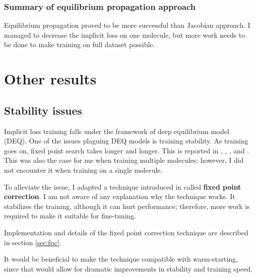 \documentclass[a4paper,10.5pt]{report}
\begin{document}
\subsubsection{Summary of equilibrium propagation approach}
Equilibrium propagation proved to be more successful than Jacobian approach. I managed to decrease the implicit loss on one molecule, but more work needs to be done to make training on full dataset possible.
\section{Other results}

\subsection{Stability issues}
Implicit loss training falls under the framework of deep equilibrium model (DEQ). One of the issues plaguing DEQ models is training stability. As training goes on, fixed point search takes longer and longer. This is reported in \cite{opticalflow}, \cite{bai2021stabilizing}, \cite{burger2025dequify}, and \cite{geng2023torchdeq}. This was also the case for me when training multiple molecules; however, I did not encounter it when training on a single molecule.

To alleviate the issue, I adapted a technique introduced in \cite{opticalflow} called \textbf{fixed point correction}. I am not aware of any explanation why the technique works. It stabilizes the training, although it can hurt performance; therefore, more work is required to make it suitable for fine-tuning.

Implementation and details of the fixed point correction technique are described in section \ref{sec:fpc}.

It would be beneficial to make the technique compatible with warm-starting, since that would allow for dramatic improvements in stability and training speed.
\end{document}
